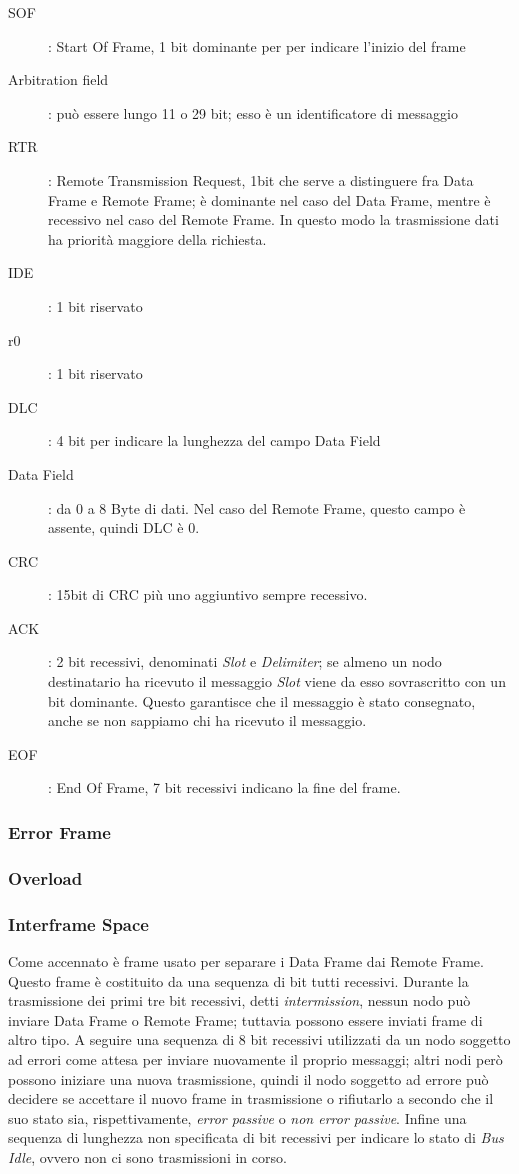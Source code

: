 \documentclass[a4paper,10pt]{book}
\begin{document}
\begin{description}
 \item[SOF]: Start Of Frame, 1 bit dominante per per indicare
l'inizio del frame
 \item[Arbitration field]: può essere lungo 11 o 29 bit; esso è un
identificatore di messaggio
 \item[RTR]: Remote Transmission Request, 1bit che serve a distinguere
fra Data Frame e Remote Frame; è dominante nel caso del Data Frame,
mentre è recessivo nel caso del Remote Frame. In questo modo la
trasmissione dati ha priorità maggiore della richiesta.
 \item[IDE]: 1 bit riservato
 \item[r0]: 1 bit riservato
 \item[DLC]: 4 bit per indicare la lunghezza del campo Data Field
 \item[Data Field]: da 0 a 8 Byte di dati. Nel caso del Remote Frame,
questo campo è assente, quindi DLC è 0.
 \item[CRC]: 15bit di CRC più uno aggiuntivo sempre recessivo.
 \item[ACK]: 2 bit recessivi, denominati \textit{Slot} e
\textit{Delimiter}; se almeno un nodo destinatario ha ricevuto il
messaggio \textit{Slot} viene da esso sovrascritto con un bit
dominante. Questo garantisce che il messaggio è stato consegnato,
anche se non sappiamo chi ha ricevuto il messaggio.
 \item[EOF]: End Of Frame, 7 bit recessivi indicano la fine del frame.
\end{description}

\subsubsection{Error Frame}
\subsubsection{Overload}
\subsubsection{Interframe Space}
Come accennato è frame usato per separare i Data Frame dai Remote
Frame. Questo frame è costituito da una sequenza di bit tutti
recessivi. Durante la trasmissione dei primi tre bit recessivi, detti
\textit{intermission}, nessun nodo può inviare Data Frame o Remote
Frame; tuttavia possono essere inviati frame di altro tipo. A seguire
una sequenza di 8 bit recessivi utilizzati da un nodo soggetto ad
errori come attesa per inviare nuovamente il proprio messaggi; altri
nodi però possono iniziare una nuova trasmissione, quindi il nodo
soggetto ad errore può decidere se accettare il nuovo frame in
trasmissione o rifiutarlo a secondo che il suo stato sia,
rispettivamente, \textit{error passive} o \textit{non error passive}.
Infine una sequenza di lunghezza non specificata di bit recessivi per
indicare lo stato di \textit{Bus Idle}, ovvero non ci sono
trasmissioni in corso.
\end{document}
